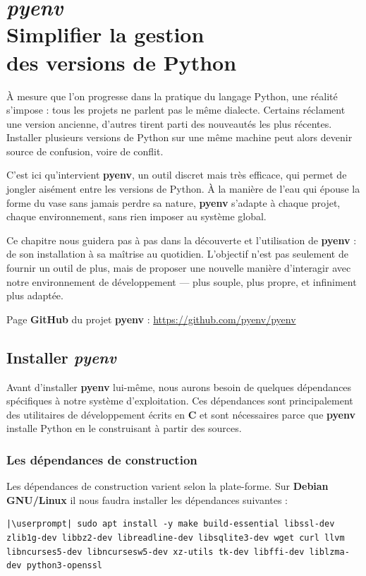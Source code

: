 \chapter[\textit{pyenv}]{\textit{pyenv} \\ Simplifier la gestion \\ des versions de Python}

\bigskip

À mesure que l’on progresse dans la pratique du langage Python, une réalité s’impose : tous les projets ne parlent pas le même dialecte. Certains réclament une version ancienne, d’autres tirent parti des nouveautés les plus récentes. Installer plusieurs versions de Python sur une même machine peut alors devenir source de confusion, voire de conflit.

C’est ici qu’intervient \textbf{pyenv}, un outil discret mais très efficace, qui permet de jongler aisément entre les versions de Python. À la manière de l’eau qui épouse la forme du vase sans jamais perdre sa nature, \textbf{pyenv} s’adapte à chaque projet, chaque environnement, sans rien imposer au système global.

Ce chapitre nous guidera pas à pas dans la découverte et l’utilisation de \textbf{pyenv} : de son installation à sa maîtrise au quotidien. L’objectif n’est pas seulement de fournir un outil de plus, mais de proposer une nouvelle manière d’interagir avec notre environnement de développement — plus souple, plus propre, et infiniment plus adaptée.

Page \textbf{GitHub} du projet \textbf{pyenv} : \url{https://github.com/pyenv/pyenv}

\section{Installer \textit{pyenv}}
Avant d'installer \textbf{pyenv} lui-même, nous aurons besoin de quelques dépendances spécifiques à notre système d'exploitation. Ces dépendances sont principalement des utilitaires de développement écrits en \textbf{C} et sont nécessaires parce que \textbf{pyenv} installe Python en le construisant à partir des sources.

\subsection*{Les dépendances de construction}
Les dépendances de construction varient selon la plate-forme. Sur \textbf{Debian GNU/Linux} il nous faudra installer les dépendances suivantes :
\begin{lstlisting}[style=bash]
|\userprompt| sudo apt install -y make build-essential libssl-dev zlib1g-dev libbz2-dev libreadline-dev libsqlite3-dev wget curl llvm libncurses5-dev libncursesw5-dev xz-utils tk-dev libffi-dev liblzma-dev python3-openssl
\end{lstlisting}

